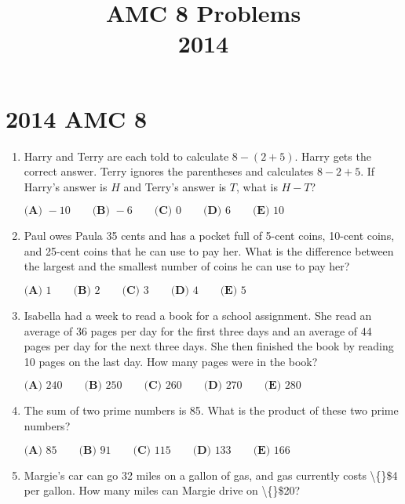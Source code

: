 \documentclass{article}
\title{AMC 8 Problems \\ 2014}
\date{}
\begin{document}
\maketitle\thispagestyle{fancy}\newpage\section*{2014 AMC 8}
\begin{enumerate}[label=\arabic*., itemsep=0.5em]
\item Harry and Terry are each told to calculate \(8 - (2 + 5)\). Harry gets the correct answer. Terry ignores the parentheses and calculates \(8 - 2 + 5\). If Harry's answer is \(H\) and Terry's answer is \(T\), what is \(H - T\)?

\(\textbf{(A) }-10\qquad\textbf{(B) }-6\qquad\textbf{(C) }0\qquad\textbf{(D) }6\qquad \textbf{(E) }10\)\par \vspace{0.5em}\item Paul owes Paula 35 cents and has a pocket full of 5-cent coins, 10-cent coins, and 25-cent coins that he can use to pay her. What is the difference between the largest and the smallest number of coins he can use to pay her?

\(\textbf{(A) }1\qquad\textbf{(B) }2\qquad\textbf{(C) }3\qquad\textbf{(D) }4\qquad \textbf{(E) }5\)\par \vspace{0.5em}\item Isabella had a week to read a book for a school assignment. She read an average of 36 pages per day for the first three days and an average of 44 pages per day for the next three days. She then finished the book by reading 10 pages on the last day. How many pages were in the book?

\(\textbf{(A) }240\qquad\textbf{(B) }250\qquad\textbf{(C) }260\qquad\textbf{(D) }270\qquad \textbf{(E) }280\)\par \vspace{0.5em}\item The sum of two prime numbers is 85. What is the product of these two prime numbers?

\(\textbf{(A) }85\qquad\textbf{(B) }91\qquad\textbf{(C) }115\qquad\textbf{(D) }133\qquad \textbf{(E) }166\)\par \vspace{0.5em}\item Margie's car can go 32 miles on a gallon of gas, and gas currently costs \textbackslash\{\}\$4 per gallon. How many miles can Margie drive on \textbackslash\{\}\$20?


\end{enumerate}
\end{document}
